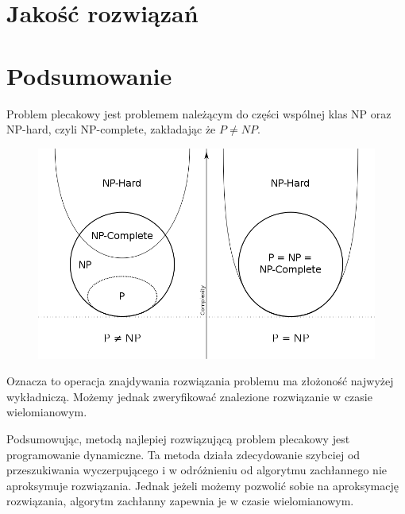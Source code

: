 \documentclass[11pt,twocolumn]{article}
\begin{document}
\section{Jakość rozwiązań}

\section{Podsumowanie}

Problem plecakowy jest problemem należącym do części wspólnej klas NP oraz NP-hard, czyli NP-complete, zakładając że $P \neq NP$.

\begin{figure}[h!]
	\includegraphics[width=\linewidth]{pnp.png}
\end{figure}

Oznacza to operacja znajdywania rozwiązania problemu ma złożoność najwyżej wykładniczą.
Możemy jednak zweryfikować znalezione rozwiązanie w czasie wielomianowym.

Podsumowując, metodą najlepiej rozwiązującą problem plecakowy
jest programowanie dynamiczne. Ta metoda działa zdecydowanie szybciej od
przeszukiwania wyczerpującego i w odróżnieniu od algorytmu zachłannego
nie aproksymuje rozwiązania.
Jednak jeżeli możemy pozwolić sobie na aproksymację rozwiązania,
algorytm zachłanny zapewnia je w czasie wielomianowym.
\end{document}
